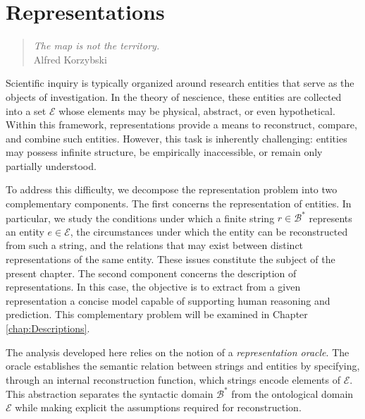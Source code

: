 %
%


\chapter{Representations}
\label{chap:Representations}

\begin{quote}
\begin{flushright}
\emph{The map is not the territory.} \\
Alfred Korzybski
\end{flushright}
\end{quote}
\bigskip

Scientific inquiry is typically organized around research entities that serve as the objects of investigation. In the theory of nescience, these entities are collected into a set $\mathcal{E}$ whose elements may be physical, abstract, or even hypothetical. Within this framework, representations provide a means to reconstruct, compare, and combine such entities. However, this task is inherently challenging: entities may possess infinite structure, be empirically inaccessible, or remain only partially understood.

To address this difficulty, we decompose the representation problem into two complementary components. The first concerns the representation of entities. In particular, we study the conditions under which a finite string $r \in \mathcal{B}^\ast$ represents an entity $e \in \mathcal{E}$, the circumstances under which the entity can be reconstructed from such a string, and the relations that may exist between distinct representations of the same entity. These issues constitute the subject of the present chapter. The second component concerns the description of representations. In this case, the objective is to extract from a given representation a concise model capable of supporting human reasoning and prediction. This complementary problem will be examined in Chapter \ref{chap:Descriptions}.

The analysis developed here relies on the notion of a \emph{representation oracle}. The oracle establishes the semantic relation between strings and entities by specifying, through an internal reconstruction function, which strings encode elements of $\mathcal{E}$. This abstraction separates the syntactic domain $\mathcal{B}^\ast$ from the ontological domain $\mathcal{E}$ while making explicit the assumptions required for reconstruction.

